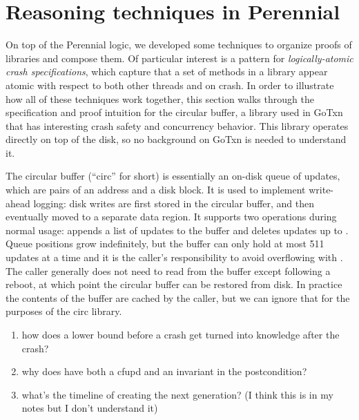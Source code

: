 \section{Reasoning techniques in Perennial}
\label{sec:perennial:techniques}

On top of the Perennial logic, we developed some techniques to organize proofs
of libraries and compose them. Of particular interest is a pattern for
\emph{logically-atomic crash specifications}, which capture that a set of
methods in a library appear atomic with respect to both other threads and on
crash. In order to illustrate how all of these techniques work together, this
section walks through the specification and proof intuition for the circular
buffer, a library used in GoTxn that has interesting crash safety and
concurrency behavior. This library operates directly on top of the disk, so no
background on GoTxn is needed to understand it.

The circular buffer (``circ'' for short) is essentially an on-disk queue of
updates, which are pairs of an address and a disk block. It is used to implement
write-ahead logging: disk writes are first stored in the circular buffer, and
then eventually moved to a separate data region. It supports two operations
during normal usage:  appends a list of updates to the buffer
and  deletes updates up to . Queue positions grow
indefinitely, but the buffer can only hold at most 511 updates at a time and it
is the caller's responsibility to avoid overflowing with . The caller
generally does not need to read from the buffer except following a reboot, at
which point the circular buffer can be restored from disk. In practice the
contents of the buffer are cached by the caller, but we can ignore that for the
purposes of the circ library.

\begin{enumerate}
  \item how does a lower bound before a crash get turned into knowledge after
  the crash?
  \item why does  have both a cfupd and an invariant in
  the postcondition?
  \item what's the timeline of creating the next generation? (I think this is in
  my notes but I don't understand it)
\end{enumerate}
